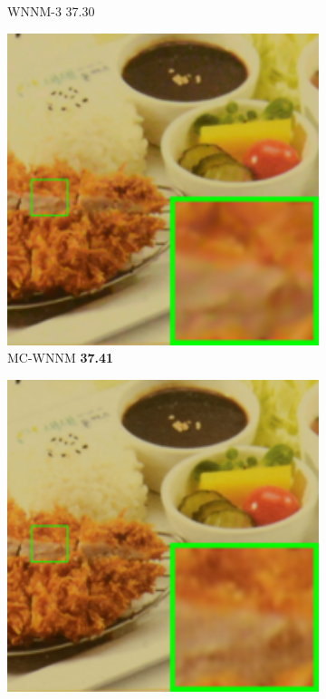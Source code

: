 \begin{figure}
\begin{subfigure}[t]{0.19\textwidth}
		\caption{WNNM-3 37.30}
    \end{subfigure}
    \hfill
    \begin{subfigure}[t]{0.19\textwidth}
        \centering
        \includegraphics[width=1\textwidth]{images/mcwnnm/cc/resize_br_CWNNM_ADMM_NL_CC15_d800_iso3200_2.png}
		\caption{MC-WNNM \textbf{37.41}}
    \end{subfigure}
    \hfill
    \begin{subfigure}[t]{0.19\textwidth}
        \centering
        \includegraphics[width=1\textwidth]{images/mcwnnm/cc/resize_br_d800_iso3200_2.png}

\end{subfigure}
\end{figure}
